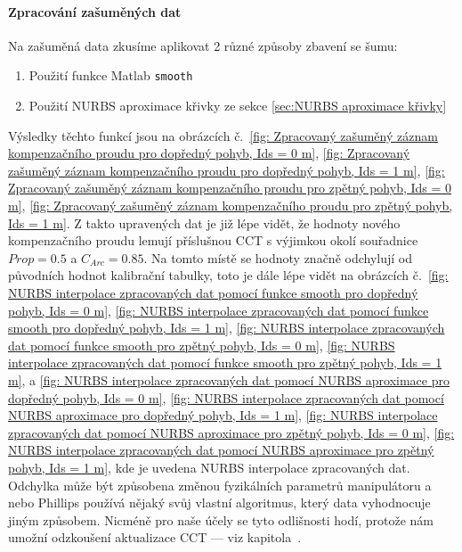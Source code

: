 \paragraph{Zpracování zašuměných dat}
Na zašuměná data zkusíme aplikovat 2 různé způsoby zbavení se šumu:
\begin{enumerate}
    \item Použití funkce Matlab \texttt{smooth}
    \item Použití NURBS aproximace křivky ze sekce \ref{sec:NURBS aproximace křivky}
\end{enumerate}
Výsledky těchto funkcí jsou na obrázcích č.~\ref{fig: Zpracovaný zašuměný záznam kompenzačního proudu pro dopředný pohyb, Ids = 0 m}, \ref{fig: Zpracovaný zašuměný záznam kompenzačního proudu pro dopředný pohyb, Ids = 1 m}, \ref{fig: Zpracovaný zašuměný záznam kompenzačního proudu pro zpětný pohyb, Ids = 0 m}, \ref{fig: Zpracovaný zašuměný záznam kompenzačního proudu pro zpětný pohyb, Ids = 1 m}. Z takto upravených dat je již lépe vidět, že hodnoty nového kompenzačního proudu lemují příslušnou CCT s výjimkou okolí souřadnice $Prop = 0.5$ a $C_{Arc} = 0.85$. Na tomto místě se hodnoty značně odchylují od původních hodnot kalibrační tabulky, toto je dále lépe vidět na obrázcích č.~\ref{fig: NURBS interpolace zpracovaných dat pomocí funkce smooth pro dopředný pohyb, Ids = 0 m}, \ref{fig: NURBS interpolace zpracovaných dat pomocí funkce smooth pro dopředný pohyb, Ids = 1 m}, \ref{fig: NURBS interpolace zpracovaných dat pomocí funkce smooth pro zpětný pohyb, Ids = 0 m}, \ref{fig: NURBS interpolace zpracovaných dat pomocí funkce smooth pro zpětný pohyb, Ids = 1 m}, a \ref{fig: NURBS interpolace zpracovaných dat pomocí NURBS aproximace pro dopředný pohyb, Ids = 0 m}, \ref{fig: NURBS interpolace zpracovaných dat pomocí NURBS aproximace pro dopředný pohyb, Ids = 1 m}, \ref{fig: NURBS interpolace zpracovaných dat pomocí NURBS aproximace pro zpětný pohyb, Ids = 0 m}, \ref{fig: NURBS interpolace zpracovaných dat pomocí NURBS aproximace pro zpětný pohyb, Ids = 1 m}, kde je uvedena NURBS interpolace zpracovaných dat. Odchylka může být způsobena změnou fyzikálních parametrů manipulátoru a nebo Phillips používá nějaký svůj vlastní algoritmus, který data vyhodnocuje jiným způsobem. Nicméně pro naše účely se tyto odlišnosti hodí, protože nám umožní odzkoušení aktualizace CCT --- viz kapitola~.
